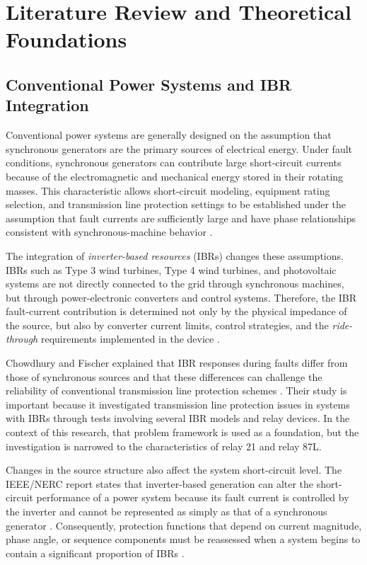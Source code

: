 \chapter{Literature Review and Theoretical Foundations}

\section{Conventional Power Systems and IBR Integration}

Conventional power systems are generally designed on the assumption that synchronous generators are the primary sources of electrical energy. Under fault conditions, synchronous generators can contribute large short-circuit currents because of the electromagnetic and mechanical energy stored in their rotating masses. This characteristic allows short-circuit modeling, equipment rating selection, and transmission line protection settings to be established under the assumption that fault currents are sufficiently large and have phase relationships consistent with synchronous-machine behavior \cite{nimpitiwan2007fault_current_contribution,ieeenerc2018tr68}.

The integration of \textit{inverter-based resources} (IBRs) changes these assumptions. IBRs such as Type 3 wind turbines, Type 4 wind turbines, and photovoltaic systems are not directly connected to the grid through synchronous machines, but through power-electronic converters and control systems. Therefore, the IBR fault-current contribution is determined not only by the physical impedance of the source, but also by converter current limits, control strategies, and the \textit{ride-through} requirements implemented in the device \cite{haddadi2021systemprotection,ieee2022std2800}.

Chowdhury and Fischer explained that IBR responses during faults differ from those of synchronous sources and that these differences can challenge the reliability of conventional transmission line protection schemes \cite{chowdhury2021tlp1}. Their study is important because it investigated transmission line protection issues in systems with IBRs through tests involving several IBR models and relay devices. In the context of this research, that problem framework is used as a foundation, but the investigation is narrowed to the characteristics of relay 21 and relay 87L.

Changes in the source structure also affect the system short-circuit level. The IEEE/NERC report states that inverter-based generation can alter the short-circuit performance of a power system because its fault current is controlled by the inverter and cannot be represented as simply as that of a synchronous generator \cite{ieeenerc2018tr68}. Consequently, protection functions that depend on current magnitude, phase angle, or sequence components must be reassessed when a system begins to contain a significant proportion of IBRs \cite{nagpal2020tr81,quispe2022transmission_review}.

